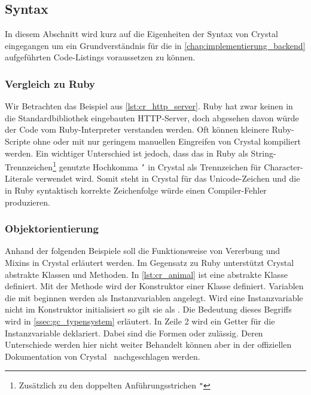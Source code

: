\subsection{Syntax}
\label{ssec:gc_syntax}

In diesem Abschnitt wird kurz auf die Eigenheiten der Syntax von Crystal
eingegangen um ein Grundverständnis für die in
\cref{chap:implementierung_backend} aufgeführten Code-Listings voraussetzen zu
können.

\subsubsection{Vergleich zu Ruby}
\label{sssec:gcs_vergleich_zu_ruby}

Wir Betrachten das Beispiel aus \cref{lst:cr_http_server}.  Ruby hat zwar keinen
in die Standardbibliothek eingebauten HTTP-Server, doch abgesehen davon würde
der Code vom Ruby-Interpreter verstanden werden.  Oft können kleinere
Ruby-Scripte ohne oder mit nur geringem manuellen Eingreifen von Crystal
kompiliert werden.  Ein wichtiger Unterschied ist jedoch, dass das in Ruby als
String-Trennzeichen\footnote{Zusätzlich zu den doppelten Anführungsstrichen
\texttt{"}} genutzte Hochkomma \texttt{'} in Crystal als Trennzeichen für
Character-Literale verwendet wird.  Somit steht  in Crystal für das
Unicode-Zeichen  und die in Ruby syntaktisch korrekte Zeichenfolge
 würde einen Compiler-Fehler produzieren.



\subsubsection{Objektorientierung}
\label{sssec:gcs_objektorientierung}

Anhand der folgenden Beispiele soll die Funktionsweise von Vererbung und
Mixins in Crystal erläutert werden.  Im Gegensatz zu Ruby unterstützt
Crystal abstrakte Klassen und Methoden.  In \cref{lst:cr_animal} ist eine
abstrakte Klasse  definiert.  Mit der Methode 
wird der Konstruktor einer Klasse definiert.  Variablen die mit 
beginnen werden als Instanzvariablen angelegt.  Wird eine Instanzvariable nicht
im Konstruktor initialisiert so gilt sie als .  Die Bedeutung
dieses Begriffs wird in \cref{ssec:gc_typensystem} erläutert.  In Zeile 2 wird
ein Getter für die Instanzvariable  deklariert.  Dabei sind die
Formen   oder  zulässig.  Deren
Unterschiede werden hier nicht weiter Behandelt können aber in der offiziellen
Dokumentation von Crystal~\cite{crystaldoc} nachgeschlagen werden.

